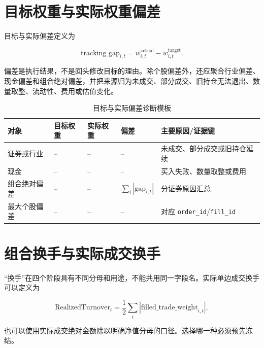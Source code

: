 \section{目标权重与实际权重偏差}

目标与实际偏差定义为

\begin{equation}
  \mathrm{tracking\_gap}_{i,t}
  =w^{\mathrm{actual}}_{i,t}-w^{\mathrm{target}}_{i,t}.
  \label{eq:ch10-tracking-gap}
\end{equation}

偏差是执行结果，不是回头修改目标的理由。除个股偏差外，还应聚合行业偏差、现金偏差和组合绝对偏差，并把来源归为未成交、部分成交、旧持仓无法退出、数量取整、流动性、费用或估值变化。

\begin{table}[htbp]
  \centering
  \small
  \caption{目标与实际偏差诊断模板}
  \label{tab:ch10-gap-template}
  \begin{tabularx}{\textwidth}{p{2.6cm} p{2.2cm} p{2.2cm} p{2.2cm} Y}
    \toprule
    对象 & 目标权重 & 实际权重 & 偏差 & 主要原因/证据键 \\
    \midrule
    证券或行业 & -- & -- & -- & 未成交、部分成交或旧持仓延续 \\
    现金 & -- & -- & -- & 买入失败、数量取整或费用 \\
    组合绝对偏差 & -- & -- & \(\sum_i|\mathrm{gap}_{i,t}|\) & 分证券原因汇总 \\
    最大个股偏差 & -- & -- & -- & 对应 \texttt{order\_id}/\texttt{fill\_id} \\
    \bottomrule
  \end{tabularx}
\end{table}

\section{组合换手与实际成交换手}

“换手”在四个阶段具有不同分母和用途，不能共用同一字段名。实际单边成交换手可以定义为

\begin{equation}
  \mathrm{RealizedTurnover}_t
  =\frac{1}{2}\sum_i
  \left|\mathrm{filled\_trade\_weight}_{i,t}\right|,
  \label{eq:ch10-realized-turnover}
\end{equation}

也可以使用实际成交绝对金额除以明确净值分母的口径。选择哪一种必须预先冻结。

